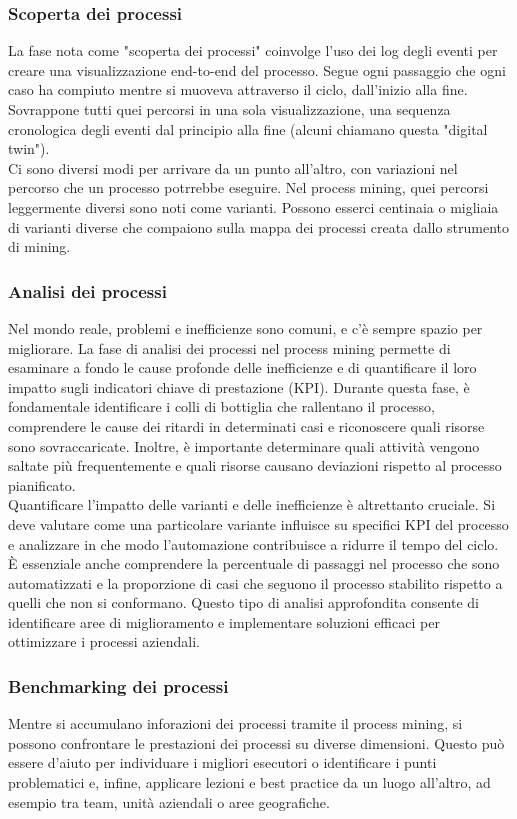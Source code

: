 \documentclass{article}
\begin{document}
\subsubsection{Scoperta dei processi}
La fase nota come "scoperta dei processi" coinvolge l'uso dei log degli eventi per creare una visualizzazione end-to-end del processo. Segue ogni passaggio che ogni caso ha compiuto mentre si muoveva attraverso il ciclo, dall'inizio alla fine. Sovrappone tutti quei percorsi in una sola visualizzazione, una sequenza cronologica degli eventi dal principio alla fine (alcuni chiamano questa "digital twin").\\
Ci sono diversi modi per arrivare da un punto all'altro, con variazioni nel percorso che un processo potrrebbe eseguire. Nel process mining, quei percorsi leggermente diversi sono noti come varianti. Possono esserci centinaia o migliaia di varianti diverse che compaiono sulla mappa dei processi creata dallo strumento di mining.
\subsubsection{Analisi dei processi}
Nel mondo reale, problemi e inefficienze sono comuni, e c'è sempre spazio per migliorare. La fase di analisi dei processi nel process mining permette di esaminare a fondo le cause profonde delle inefficienze e di quantificare il loro impatto sugli indicatori chiave di prestazione (KPI). Durante questa fase, è fondamentale identificare i colli di bottiglia che rallentano il processo, comprendere le cause dei ritardi in determinati casi e riconoscere quali risorse sono sovraccaricate. Inoltre, è importante determinare quali attività vengono saltate più frequentemente e quali risorse causano deviazioni rispetto al processo pianificato.\\
Quantificare l'impatto delle varianti e delle inefficienze è altrettanto cruciale. Si deve valutare come una particolare variante influisce su specifici KPI del processo e analizzare in che modo l'automazione contribuisce a ridurre il tempo del ciclo. È essenziale anche comprendere la percentuale di passaggi nel processo che sono automatizzati e la proporzione di casi che seguono il processo stabilito rispetto a quelli che non si conformano. Questo tipo di analisi approfondita consente di identificare aree di miglioramento e implementare soluzioni efficaci per ottimizzare i processi aziendali.

\subsubsection{Benchmarking dei processi}
Mentre si accumulano inforazioni dei processi tramite il process mining, si possono confrontare le prestazioni dei processi su diverse dimensioni. Questo può essere d'aiuto per individuare i migliori esecutori o identificare i punti problematici e, infine, applicare lezioni e best practice da un luogo all'altro, ad esempio tra team, unità aziendali o aree geografiche.
\end{document}
